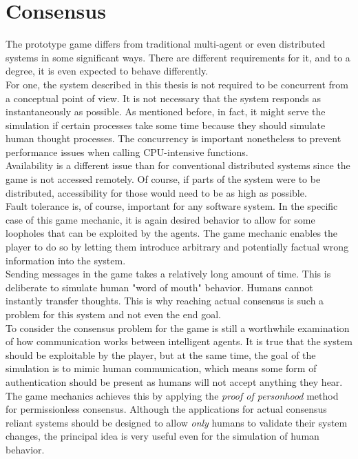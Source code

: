 \section{Consensus}
The prototype game differs from traditional multi-agent or even distributed systems in some significant ways. There are different requirements for it, and to a degree, it is even expected to behave differently.\\
For one, the system described in this thesis is not required to be concurrent from a conceptual point of view. It is not necessary that the system responds as instantaneously as possible. As mentioned before, in fact,  it might serve the simulation if certain processes take some time because they should simulate human thought processes. The concurrency is important nonetheless to prevent performance issues when calling CPU-intensive functions.\\
Availability is a different issue than for conventional distributed systems since the game is not accessed remotely. Of course, if parts of the system were to be distributed, accessibility for those would need to be as high as possible.\\
Fault tolerance is, of course, important for any software system. In the specific case of this game mechanic, it is again desired behavior to allow for some loopholes that can be exploited by the agents. The game mechanic enables the player to do so by letting them introduce arbitrary and potentially factual wrong information into the system.\\
Sending messages in the game takes a relatively long amount of time. This is deliberate to simulate human "word of mouth" behavior. Humans cannot instantly transfer thoughts. This is why reaching actual consensus is such a problem for this system and not even the end goal.\\
To consider the consensus problem for the game is still a worthwhile examination of how communication works between intelligent agents. It is true that the system should be exploitable by the player, but at the same time, the goal of the simulation is to mimic human communication, which means some form of authentication should be present as humans will not accept anything they hear.\\
The game mechanics achieves this by applying the \textit{proof of personhood} method for permissionless consensus. Although the applications for actual consensus reliant systems should be designed to allow \textit{only} humans to validate their system changes, the principal idea is very useful even for the simulation of human behavior.\\
